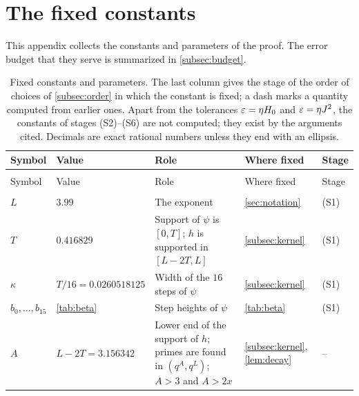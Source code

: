 \section{The fixed constants}\label{app:constants}

This appendix collects the constants and parameters of the proof. The error budget that they
serve is summarized in \cref{subsec:budget}.

{\small
\setlength{\tabcolsep}{4pt}
\setlength{\LTcapwidth}{\linewidth}
\begin{longtable}{@{}>{\raggedright\arraybackslash}p{}
                  >{\raggedright\arraybackslash}p{}
                  >{\raggedright\arraybackslash}p{}
                  >{\raggedright\arraybackslash}p{}
                  >{\raggedright\arraybackslash}p{}@{}}
\caption{Fixed constants and parameters. The last column gives the stage of the order of
choices of \cref{subsec:order} in which the constant is fixed; a dash marks a quantity computed
from earlier ones. Apart from the tolerances $\varepsilon=\eta H_0$ and $\varepsilon=\eta J^2$, the constants
of stages (S2)--(S6) are not computed; they exist by the arguments cited. Decimals are exact
rational numbers unless they end with an ellipsis.}
\label{tab:constants}\\
\toprule
Symbol & Value & Role & Where fixed & Stage\\
\midrule
\endfirsthead
\multicolumn{5}{@{}l}{\emph{\cref{tab:constants}, continued}}\\
\toprule
Symbol & Value & Role & Where fixed & Stage\\
\midrule
\endhead
\bottomrule
\endlastfoot
\multicolumn{5}{@{}l}{\emph{Exponent and kernel}}\\
$L$ & $3.99$ & The exponent & \cref{sec:notation} & (S1)\\
$T$ & $0.416829$ & Support of $\psi$ is $[0,T]$; $h$ is supported in $[L-2T,L]$ & \cref{subsec:kernel} & (S1)\\
$\kappa$ & $T/16=0.0260518125$ & Width of the $16$ steps of $\psi$ & \cref{subsec:kernel} & (S1)\\
$b_0,\dots,b_{15}$ & \cref{tab:beta} & Step heights of $\psi$ & \cref{tab:beta} & (S1)\\
$A$ & $L-2T=3.156342$ & Lower end of the support of $h$; primes are found in $(q^A,q^L)$; $A>3$ and $A>2x$ & \cref{subsec:kernel}, \cref{lem:decay} & --\\

\end{longtable}}

